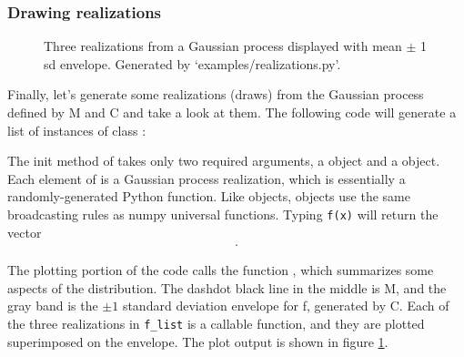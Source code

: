 \documentclass[]{manual}
\begin{document}
\subsubsection{Drawing realizations}\label{subsub:realizations}
\begin{figure}
    \centering
    \caption{Three realizations from a Gaussian process displayed with mean $\pm$ 1 sd envelope. Generated by {\sffamily `examples/realizations.py'}.}
    \label{fig:realizations}
\end{figure}

Finally, let's generate some realizations (draws) from the Gaussian process defined by M and C and take a look at them. The following code will generate a list of instances of class :


    The init method of  takes only two required arguments, a  object and a  object. Each element of  is a Gaussian process realization, which is essentially a randomly-generated Python function. Like  objects,  objects use the same broadcasting rules as numpy universal functions. Typing \texttt{f(x)} will return the vector 
\begin{eqnarray*}
    [\texttt{f(x[0])}\ldots \texttt{f(x[N-1])}].
\end{eqnarray*}
    

The plotting portion of the code calls the function , which summarizes some aspects of the distribution. The dashdot black line in the middle is M, and the gray band is the $\pm 1$ standard deviation envelope for f, generated by C. Each of the three realizations in \texttt{f_list} is a callable function, and they are plotted superimposed on the envelope. The plot output is shown in figure \ref{fig:realizations}. 
\end{document}
